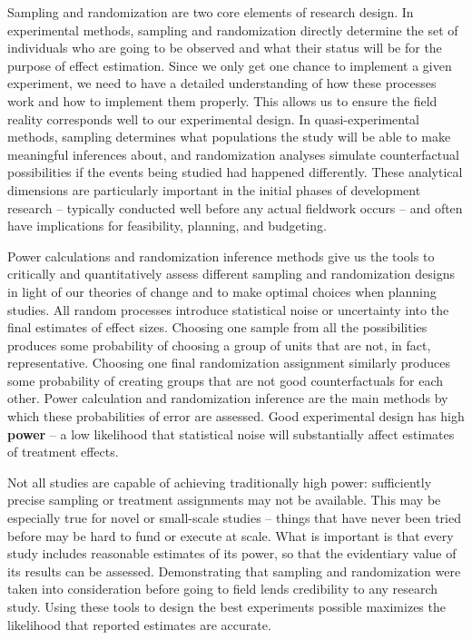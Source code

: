 
\begin{fullwidth}
Sampling and randomization are two core elements of research design.
In experimental methods, sampling and randomization directly determine
the set of individuals who are going to be observed
and what their status will be for the purpose of effect estimation.
Since we only get one chance to implement a given experiment,
we need to have a detailed understanding of how these processes work
and how to implement them properly.
This allows us to ensure the field reality corresponds well to our experimental design.
In quasi-experimental methods,
sampling determines what populations the study
will be able to make meaningful inferences about,
and randomization analyses simulate counterfactual possibilities
if the events being studied had happened differently.
These analytical dimensions are particularly important in the initial phases of development research --
typically conducted well before any actual fieldwork occurs --
and often have implications for feasibility, planning, and budgeting.

Power calculations and randomization inference methods
give us the tools to critically and quantitatively assess different
sampling and randomization designs in light of our theories of change
and to make optimal choices when planning studies.
All random processes introduce statistical noise
or uncertainty into the final estimates of effect sizes.
Choosing one sample from all the possibilities produces some probability of
choosing a group of units that are not, in fact, representative.
Choosing one final randomization assignment similarly produces some probability of
creating groups that are not good counterfactuals for each other.
Power calculation and randomization inference
are the main methods by which these probabilities of error are assessed.
Good experimental design has high \textbf{power} -- a low likelihood that statistical noise
will substantially affect estimates of treatment effects.

Not all studies are capable of achieving traditionally high power:
sufficiently precise sampling or treatment assignments may not be available.
This may be especially true for novel or small-scale studies --
things that have never been tried before may be hard to fund or execute at scale.
What is important is that every study includes reasonable estimates of its power,
so that the evidentiary value of its results can be assessed.
Demonstrating that sampling and randomization were taken into consideration
before going to field lends credibility to any research study.
Using these tools to design the best experiments possible
maximizes the likelihood that reported estimates are accurate.
\end{fullwidth}

